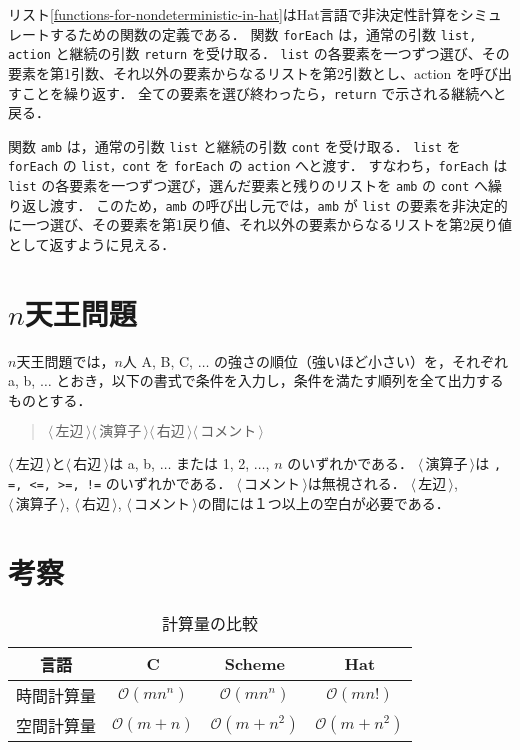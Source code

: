 \documentclass[10pt,a4j,twocolumn,oneside]{jsarticle}
\newcommand{\NT}[1]{\ensuremath{\langle\!\,\mbox{#1}\!\,\rangle}\allowbreak}
\newcommand{\C}[1]{\mbox{\tt#1}}
\begin{document}
リスト\ref{functions-for-nondeterministic-in-hat}はHat言語で非決定性計算をシミュレートするための関数の定義である\cite{Yokomoto201910}．
関数 \C{forEach} は，通常の引数 \C{list, action} と継続の引数 \C{return} を受け取る．
\C{list} の各要素を一つずつ選び、その要素を第1引数、それ以外の要素からなるリストを第2引数とし、action を呼び出すことを繰り返す．
全ての要素を選び終わったら，\C{return} で示される継続へと戻る．

関数 \C{amb} は，通常の引数 \C{list} と継続の引数 \C{cont} を受け取る．
\C{list} を \C{forEach} の \C{list，cont} を \C{forEach} の \C{action} へと渡す．
すなわち，\C{forEach} は \C{list} の各要素を一つずつ選び，選んだ要素と残りのリストを \C{amb} の \C{cont} へ繰り返し渡す．
このため，\C{amb} の呼び出し元では，\C{amb} が \C{list} の要素を非決定的に一つ選び、その要素を第1戻り値、それ以外の要素からなるリストを第2戻り値として返すように見える．

\section{$n$天王問題}

$n$天王問題では，$n$人 A, B, C, $\ldots$ の強さの順位（強いほど小さい）を，それぞれ a, b, $\ldots$ とおき，以下の書式で条件を入力し，条件を満たす順列を全て出力するものとする．
\begin{quote}
\NT{左辺}\NT{演算子}\NT{右辺}\NT{コメント}
\end{quote}
\NT{左辺}と\NT{右辺}は a, b, $\ldots$ または 1, 2, $\ldots$, $n$ のいずれかである．
\NT{演算子}は \C{<, >, =, <=, >=, !=} のいずれかである．
\NT{コメント}は無視される．
\NT{左辺}, \NT{演算子}, \NT{右辺}, \NT{コメント}の間には１つ以上の空白が必要である．

\section{考察}


\begin{table}[tb]
\begin{center}
\caption{計算量の比較}
  \begin{tabular}{|c|c|c|c|} \hline
    言語 & C & Scheme & Hat \\ \hline \hline
    時間計算量 & $\mathcal O(mn^n)$ & $\mathcal O(mn^n)$ & $\mathcal O(mn!)$ \\ \hline
    空間計算量 & $\mathcal O(m+n)$ & $\mathcal O(m+n^2)$ & $\mathcal O(m+n^2)$ \\ \hline
  \end{tabular}
  \label{tab:complexity}
  \end{center}
\end{table}
\end{document}
